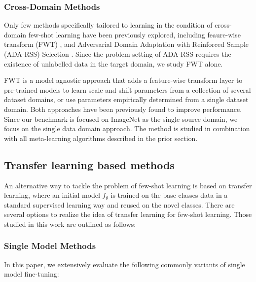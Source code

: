 \documentclass[runningheads]{llncs}
\begin{document}
\subsubsection{Cross-Domain Methods}

Only few methods specifically tailored to learning in the condition of cross-domain few-shot learning have been previously explored, including feaure-wise transform (FWT) \cite{tsengcrossdomain}, and Adversarial Domain Adaptation with Reinforced Sample (ADA-RSS)
Selection \cite{dongxing}. Since the problem setting of ADA-RSS requires the existence of unlabelled data in the target domain, we study FWT alone. 

FWT is a model agnostic approach that adds a feature-wise transform layer to pre-trained models to learn scale and shift parameters from a collection of several dataset domains, or use parameters empirically determined from a single dataset domain. Both approaches have been previously found to improve performance. Since our benchmark is focused on ImageNet as the single source domain, we focus on the single data domain approach. The method is studied in combination with all meta-learning algorithms described in the prior section. 


\subsection{Transfer learning based methods}
An alternative way to tackle the problem of few-shot learning is based on transfer learning, where an initial model $f_\theta$ is trained on the base classes data in a standard supervised learning way and reused on the novel classes. There are several options to realize the idea of transfer learning for few-shot learning. Those studied in this work are outlined as follows:



\subsubsection{Single Model Methods}
 In this paper, we extensively evaluate the following commonly variants of single model fine-tuning:
\end{document}
